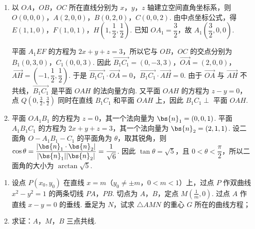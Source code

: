 \begin{solution}
\begin{enumerate}
\item 以 \(OA\)，\(OB\)，\(OC\) 所在直线分别为 \(x\)，\(y\)，\(z\) 轴建立空间直角坐标系，则 \(O(0,0,0)\)，\(A(2,0,0)\)，\(B(0,2,0)\)，\(C(0,0,2)\). 由中点坐标公式，得 \(E(1,1,0)\)，\(F(1,0,1)\)，\(H\left(1,\dfrac{1}{2},\dfrac{1}{2}\right)\). 已知 \(OA_1=\dfrac{3}{2}\)，故 \(A_1\left(\dfrac{3}{2},0,0\right)\).

平面 \(A_1EF\) 的方程为 \(2x+y+z=3\)，所以它与 \(OB\)，\(OC\) 的交点分别为 \(B_1(0,3,0)\)，\(C_1(0,0,3)\). 因此 \(\overrightarrow{B_1C_1}=(0,-3,3)\)，\(\overrightarrow{OA}=(2,0,0)\)，\(\overrightarrow{AH}=\left(-1,\dfrac{1}{2},\dfrac{1}{2}\right)\). 于是 \(\overrightarrow{B_1C_1}\cdot\overrightarrow{OA}=0\)，\(\overrightarrow{B_1C_1}\cdot\overrightarrow{AH}=0\). 由于 \(\overrightarrow{OA}\) 与 \(\overrightarrow{AH}\) 不共线，\(\overrightarrow{B_1C_1}\) 是平面 \(OAH\) 的法向量方向. 又平面 \(OAH\) 的方程为 \(z-y=0\)，点 \(Q\left(0,\frac32,\frac32\right)\) 同时在直线 \(B_1C_1\) 和平面 \(OAH\) 上，因此 \(B_1C_1\perp\) 平面 \(OAH\).

\item 平面 \(OA_1B_1\) 的方程为 \(z=0\)，其一个法向量为 \(\bs{n}_1=(0,0,1)\). 平面 \(A_1B_1C_1\) 的方程为 \(2x+y+z=3\)，其一个法向量为 \(\bs{n}_2=(2,1,1)\). 设二面角 \(O-A_1B_1-C_1\) 的平面角为 \(\theta\)，取其锐角，则
\(\cos\theta=\dfrac{|\bs{n}_1\cdot\bs{n}_2|}{|\bs{n}_1||\bs{n}_2|}=\dfrac{1}{\sqrt{6}}\). 因此 \(\tan\theta=\sqrt{5}\)，且 \(0<\theta<\dfrac{\pi}{2}\)，所以二面角的大小为 \(\arctan\sqrt{5}\).
\end{enumerate}
\end{solution}

\begin{problem}
\begin{enumerate}
\item 设点 \(P(x_0, y_0)\) 在直线 \(x = m\)（\(y_0 \neq \pm m\)，\(0 < m < 1\)）上，过点 \(P\) 作双曲线 \(x^2 - y^2 = 1\) 的两条切线 \(PA\)，\(PB\). 切点为 \(A\)，\(B\)，定点 \(M\left(\frac{1}{m}, 0\right)\). 过点 \(A\) 作直线 \(x - y = 0\) 的垂线. 垂足为 \(N\)，试求 \(\triangle AMN\) 的重心 \(G\) 所在的曲线方程；
\item 求证：\(A\)，\(M\)，\(B\) 三点共线.
\end{enumerate}
\end{problem}

